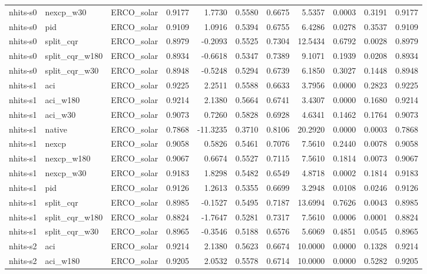 \begin{tabular}{lllrrrrrrrr}
nhits-s0 & nexcp_w30 & ERCO_solar & 0.9177 & 1.7730 & 0.5580 & 0.6675 & 5.5357 & 0.0003 & 0.3191 & 0.9177 \\
nhits-s0 & pid & ERCO_solar & 0.9109 & 1.0916 & 0.5394 & 0.6755 & 6.4286 & 0.0278 & 0.3537 & 0.9109 \\
nhits-s0 & split_cqr & ERCO_solar & 0.8979 & -0.2093 & 0.5525 & 0.7304 & 12.5434 & 0.6792 & 0.0028 & 0.8979 \\
nhits-s0 & split_cqr_w180 & ERCO_solar & 0.8934 & -0.6618 & 0.5347 & 0.7389 & 9.1071 & 0.1939 & 0.0208 & 0.8934 \\
nhits-s0 & split_cqr_w30 & ERCO_solar & 0.8948 & -0.5248 & 0.5294 & 0.6739 & 6.1850 & 0.3027 & 0.1448 & 0.8948 \\
nhits-s1 & aci & ERCO_solar & 0.9225 & 2.2511 & 0.5588 & 0.6633 & 3.7956 & 0.0000 & 0.2823 & 0.9225 \\
nhits-s1 & aci_w180 & ERCO_solar & 0.9214 & 2.1380 & 0.5664 & 0.6741 & 3.4307 & 0.0000 & 0.1680 & 0.9214 \\
nhits-s1 & aci_w30 & ERCO_solar & 0.9073 & 0.7260 & 0.5828 & 0.6928 & 4.6341 & 0.1462 & 0.1764 & 0.9073 \\
nhits-s1 & native & ERCO_solar & 0.7868 & -11.3235 & 0.3710 & 0.8106 & 20.2920 & 0.0000 & 0.0003 & 0.7868 \\
nhits-s1 & nexcp & ERCO_solar & 0.9058 & 0.5826 & 0.5461 & 0.7076 & 7.5610 & 0.2440 & 0.0078 & 0.9058 \\
nhits-s1 & nexcp_w180 & ERCO_solar & 0.9067 & 0.6674 & 0.5527 & 0.7115 & 7.5610 & 0.1814 & 0.0073 & 0.9067 \\
nhits-s1 & nexcp_w30 & ERCO_solar & 0.9183 & 1.8298 & 0.5482 & 0.6549 & 4.8718 & 0.0002 & 0.1814 & 0.9183 \\
nhits-s1 & pid & ERCO_solar & 0.9126 & 1.2613 & 0.5355 & 0.6699 & 3.2948 & 0.0108 & 0.0246 & 0.9126 \\
nhits-s1 & split_cqr & ERCO_solar & 0.8985 & -0.1527 & 0.5495 & 0.7187 & 13.6994 & 0.7626 & 0.0043 & 0.8985 \\
nhits-s1 & split_cqr_w180 & ERCO_solar & 0.8824 & -1.7647 & 0.5281 & 0.7317 & 7.5610 & 0.0006 & 0.0001 & 0.8824 \\
nhits-s1 & split_cqr_w30 & ERCO_solar & 0.8965 & -0.3546 & 0.5188 & 0.6576 & 5.6069 & 0.4851 & 0.0545 & 0.8965 \\
nhits-s2 & aci & ERCO_solar & 0.9214 & 2.1380 & 0.5623 & 0.6674 & 10.0000 & 0.0000 & 0.1328 & 0.9214 \\
nhits-s2 & aci_w180 & ERCO_solar & 0.9205 & 2.0532 & 0.5578 & 0.6714 & 10.0000 & 0.0000 & 0.5282 & 0.9205 \\

\end{tabular}
